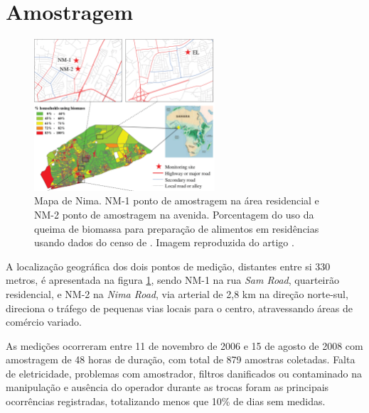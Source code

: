 \section{Amostragem}


\begin{figure}[H]
\begin{center}
  \includegraphics[width=0.6\textwidth]{../inputs/images/zheng/nima_mapa.pdf}
  \caption{Mapa de Nima. NM-1 ponto de amostragem na área residencial e 
           NM-2 ponto de amostragem na avenida. Porcentagem do uso da queima
           de biomassa para preparação de alimentos em residências usando dados
           do censo de \citeyearpar{ghanacensus2003}. Imagem reproduzida do 
           artigo \citet{zhou2013}. \label{fig:nima_mapa}}
\end{center}
\end{figure}

A localização geográfica dos dois pontos de medição, distantes entre si 330
metros, é apresentada na figura
\ref{fig:nima_mapa}, sendo NM-1 na rua \textit{Sam Road}, quarteirão residencial,
e NM-2 na \textit{Nima Road}, via arterial de 2,8 km na direção norte-sul, 
direciona o tráfego de pequenas vias locais para o centro, atravessando áreas de 
comércio variado. 

As medições ocorreram entre 11 de novembro de 2006 e 15 de agosto de 2008 com 
amostragem de 48 horas de duração, com total de 879 amostras coletadas. 
Falta de eletricidade, problemas com amostrador, 
filtros danificados ou contaminado na manipulação e ausência do 
operador durante as trocas foram as principais ocorrências registradas, 
totalizando menos que 10\% de dias sem medidas. 

